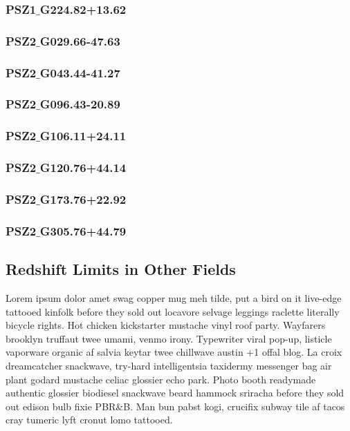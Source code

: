 \documentclass[apj, revtex4]{emulateapj}
\begin{document}
\subsubsection{PSZ1$\_$G224.82+13.62}

\subsubsection{PSZ2$\_$G029.66-47.63}

\subsubsection{PSZ2$\_$G043.44-41.27}

\subsubsection{PSZ2$\_$G096.43-20.89}

\subsubsection{PSZ2$\_$G106.11+24.11}

\subsubsection{PSZ2$\_$G120.76+44.14}

\subsubsection{PSZ2$\_$G173.76+22.92}

\subsubsection{PSZ2$\_$G305.76+44.79}

\subsection{Redshift Limits in Other Fields}

Lorem ipsum dolor amet swag copper mug meh tilde, put a bird on it live-edge tattooed kinfolk before they sold out locavore selvage leggings raclette literally bicycle rights. Hot chicken kickstarter mustache vinyl roof party. Wayfarers brooklyn truffaut twee umami, venmo irony. Typewriter viral pop-up, listicle vaporware organic af salvia keytar twee chillwave austin +1 offal blog. La croix dreamcatcher snackwave, try-hard intelligentsia taxidermy messenger bag air plant godard mustache celiac glossier echo park. Photo booth readymade authentic glossier biodiesel snackwave beard hammock sriracha before they sold out edison bulb fixie PBR\&B. Man bun pabst kogi, crucifix subway tile af tacos cray tumeric lyft cronut lomo tattooed.
\end{document}
